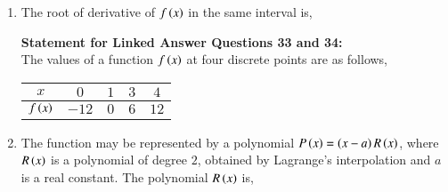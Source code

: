 \documentclass[journal]{IEEEtran}
\begin{document}
\begin{enumerate}
\begin{enumerate}
\end{enumerate}
\item The root of derivative of $f\left(x\right)$ in the same interval is,
\begin{enumerate}
\end{enumerate}
\textbf{Statement for Linked Answer Questions 33 and 34:}\\
The values of a function $f\left(x\right)$ at four discrete points are as follows,
\begin{table}[h!]
\centering
\begin{tabular}{|c|c|c|c|c|}
\hline
	$x$ & $0$ & $1$ & $3$ & $4$ \\ \hline
	$f\left(x\right)$ & $-12$ & $0$ & $6$ & $12$\\ \hline
\end{tabular}
\end{table}
\item The function may be represented by a polynomial $P\left(x\right)=\left(x-a\right)R\left(x\right)$, where $R\left(x\right)$ is a polynomial of degree $2$, obtained by Lagrange's interpolation and $a$ is a real constant. The polynomial $R\left(x\right)$ is,
\begin{enumerate}
\end{enumerate}
\end{enumerate}
\end{document}
